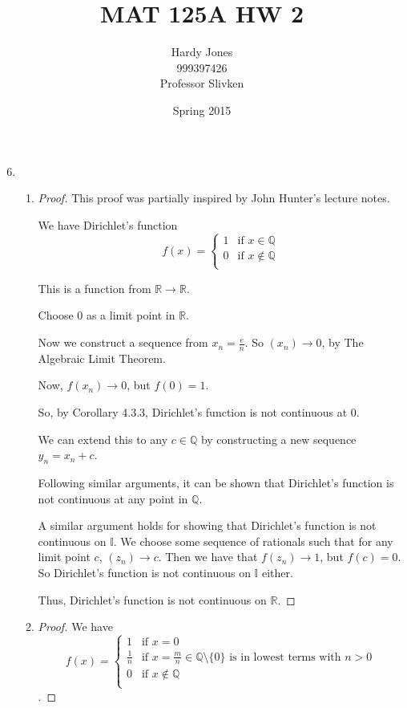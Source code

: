 \documentclass[12pt,letterpaper]{article}
\title{MAT 125A HW 2\vspace{-2ex}}
\author{Hardy Jones\\
        999397426\\
        Professor Slivken\vspace{-2ex}}
\date{Spring 2015}
\newcommand\e{e}
\begin{document}
  \maketitle

  \begin{enumerate}[label=Exercise 4.3.\arabic*]
    \setcounter{enumi}{5}
    \item
      \begin{enumerate}
        \item
          \begin{proof}
            This proof was partially inspired by John Hunter's lecture notes.

            We have Dirichlet's function
            \[
              f(x) =
              \begin{cases}
                1 & \text{if } x \in \mathbb{Q} \\
                0 & \text{if } x \notin \mathbb{Q} \\
              \end{cases}
            \]

            This is a function from $\mathbb{R} \to \mathbb{R}$.

            Choose 0 as a limit point in $\mathbb{R}$.

            Now we construct a sequence from $x_n = \frac{\e}{n}$.
            So $(x_n) \to 0$, by The Algebraic Limit Theorem.

            Now, $f(x_n) \to 0$, but $f(0) = 1$.

            So, by Corollary 4.3.3, Dirichlet's function is not continuous at 0.

            We can extend this to any $c \in \mathbb{Q}$
            by constructing a new sequence $y_n = x_n + c$.

            Following similar arguments,
            it can be shown that Dirichlet's function is not continuous at any point in $\mathbb{Q}$.

            A similar argument holds for showing that Dirichlet's function is not continuous on $\mathbb{I}$.
            We choose some sequence of rationals such that for any limit point $c$,
            $(z_n) \to c$.
            Then we have that $f(z_n) \to 1$, but $f(c) = 0$.
            So Dirichlet's function is not continuous on $\mathbb{I}$ either.

            Thus, Dirichlet's function is not continuous on $\mathbb{R}$.
          \end{proof}
        \item
          \begin{proof}
            We have
            \[
              f(x) =
              \begin{cases}
                1           & \text{if } x = 0 \\
                \frac{1}{n} & \text{if } x = \frac{m}{n} \in \mathbb{Q} \setminus \{0\} \text{ is in lowest terms with } n > 0 \\
                0           & \text{if } x \notin \mathbb{Q} \\
              \end{cases}
            \].


\end{proof}
\end{enumerate}
\end{enumerate}
\end{document}
